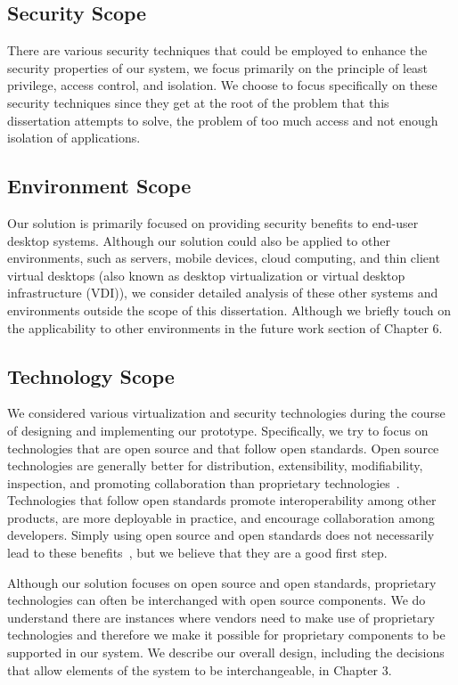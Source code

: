 \subsection{Security Scope}

There are various security techniques that could be employed to enhance the security properties of our system, we focus primarily on the principle of least privilege, access control, and isolation. We choose to focus specifically on these security techniques since they get at the root of the problem that this dissertation attempts to solve, the problem of too much access and not enough isolation of applications.

\subsection{Environment Scope}

Our solution is primarily focused on providing security benefits to end-user desktop systems. Although our solution could also be applied to other environments, such as servers, mobile devices, cloud computing, and thin client virtual desktops (also known as desktop virtualization or virtual desktop infrastructure (VDI)), we consider detailed analysis of these other systems and environments outside the scope of this dissertation. Although we briefly touch on the applicability to other environments in the future work section of Chapter 6.

\subsection{Technology Scope}

We considered various virtualization and security technologies during the course of designing and implementing our prototype. Specifically, we try to focus on technologies that are open source and that follow open standards. Open source technologies are generally better for distribution, extensibility, modifiability, inspection, and promoting collaboration than proprietary technologies~\cite{ben-yehuda_osr_2008}. Technologies that follow open standards promote interoperability among other products, are more deployable in practice, and encourage collaboration among developers. Simply using open source and open standards does not necessarily lead to these benefits~\cite{crosby_blog_interoperability_2010,gigaom_blog_2010}, but we believe that they are a good first step.

Although our solution focuses on open source and open standards, proprietary technologies can often be interchanged with open source components. We do understand there are instances where vendors need to make use of proprietary technologies and therefore we make it possible for proprietary components to be supported in our system. We describe our overall design, including the decisions that allow elements of the system to be interchangeable, in Chapter 3.

